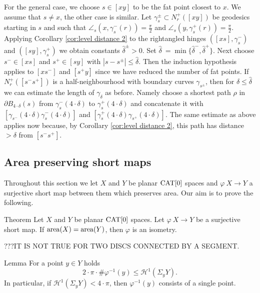 \documentclass[a4paper,10pt]{amsart}
\begin{document}
For the general case, we choose $s\in[xy]$ to be the fat point closest to $x$. We assume that $s\neq x$,
the other case is similar. Let $\gamma_s^\pm\subset N_r^+([x y])$ be geodesics starting in $s$ and such that 
$\angle_s(x,\gamma_s^-(r))=\frac{\pi}{2}$ and $\angle_s(y,\gamma_s^+(r))=\frac{\pi}{2}$. Applying Corollary 
\ref{cor:level distance 2}
to the rightangled hinges $([xs],\gamma_s^-)$ and $([sy],\gamma_s^+)$ we obtain constants $\hat\delta^\pm>0$. 
Set $\hat\delta\:=\min\{\hat\delta^-,\hat\delta^+\}$.
Next choose $s^-\in[xs]$ and $s^+\in[sy]$ with $|s-s^\pm|\leq\hat\delta$. Then the induction hypothesis applies 
to $[xs^-]$ and $[s^+y]$ since we have reduced 
the number of fat points. If $N^+_r([s^- s^+])$ is a half-neighbourhood with boundary curves $\gamma_{s^\pm}$, 
then for $\delta\leq\hat\delta$ we can estimate the length of $\gamma_\delta$ as before. 
Namely choose a shortest path $\rho$ in $\partial B_{4\cdot\delta}(s)$ from $\gamma_s^-(4\cdot\delta)$ to $\gamma_s^+(4\cdot\delta)$ 
and concatenate it 
with $[\gamma_{s^-}(4\cdot\delta)\gamma_s^-(4\cdot\delta)]$ and $[\gamma_s^+(4\cdot\delta)\gamma_{s^+}(4\cdot\delta)]$. The same estimate 
as above applies now because, by Corollary \ref{cor:level distance 2}, this path has distance $>\delta$ from $[s^- s^+]$.
\qeds



\subsection{Area preserving short maps}


Throughout this section we let $X$ and $Y$ be planar $\mathop{\rm CAT}\nolimits[0]$ spaces and
 $\varphi\:X\to Y$ a surjective short map between them which preserves area.
 Our aim is to prove the following.

\begin{thm}{Theorem}\label{thm:short+area=isom}
Let $X$ and $Y$ be planar $\mathop{\rm CAT}\nolimits[0]$ spaces. 
Let $\varphi\:X\to Y$ be a surjective short map. 
If $\mathop{\rm area}\nolimits(X)=\mathop{\rm area}\nolimits(Y)$,
then $\varphi$ is an isometry. 
\end{thm}

???IT IS NOT TRUE FOR TWO DISCS CONNECTED BY A SEGMENT.


\begin{thm}{Lemma}\label{lem:inverse image estimate}
For a point $y\in Y$ holds 
$$
2{\cdot}\pi\cdot \#\varphi^{-1}(y)\leq\mathcal{H}^1(\Sigma_y Y). 
$$
In particular, if $\mathcal{H}^1(\Sigma_y Y)<4{\cdot}\pi$, then $\varphi^{-1}(y)$
consists of a single point.
\end{thm}
\end{document}
